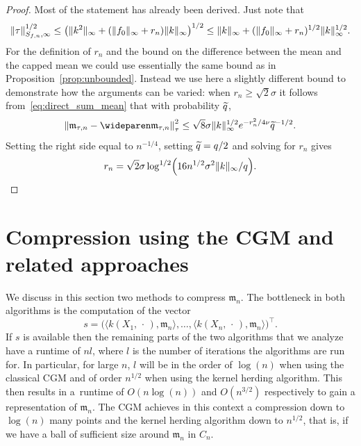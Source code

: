 \documentclass[AHL,Unicode,longabstracts,published]{cedram}
\theoremstyle{remark}
\newcommand{\mean}{\mathfrak{m}}
\let\oldtilde\tilde
\renewcommand*{\tilde}[1]{\mathchoice{\widetilde{#1}}{\widetilde{#1}}{\oldtilde{#1}}{\oldtilde{#1}}}
\let\originalleft\left
\let\originalright\right
\renewcommand{\left}{\mathopen{}\mathclose\bgroup\originalleft}
\renewcommand{\right}{\aftergroup\egroup\originalright}
\begin{document}
\begin{proof}
Most of the statement has already been derived. Just note that
\[
\|\tau\|_{S_{f,n},\infty}^{1/2}
\leq \left(\|k^2\|_\infty + (\|f_0\|_\infty + r_n) \|k\|_\infty\right)^{1/2} \leq \|k\|_\infty + (\|f_0\|_\infty + r_n)^{1/2} \|k\|_\infty^{1/2}.
\]
For the definition of $r_n$ and the bound on the difference between the mean and the capped mean we could use essentially the same bound as in Proposition~\ref{prop:unbounded}. Instead we use here a slightly different bound to demonstrate how the arguments can be varied: when $r_n \geq \sqrt{2} \sigma$ it follows from~\eqref{eq:direct_sum_mean} that with probability $\tilde q$,
\[
\left\| \mean_{\tau,n} - \wideparen \mean_{\tau,n} \right\|^2_\tau \leq \sqrt{8} \sigma \|k\|^{1/2}_\infty e^{-r_n^2/4 \nu}
\tilde q^{-1/2}.
\]
Setting the right side equal to $n^{-1/4}$, setting $\tilde q = q/2$ and solving for $r_n$ gives
\[
r_n =\sqrt{2} \sigma \log^{1/2}\left(16 n^{1/2} \sigma^2 \|k\|_\infty/ q\right).\qedhere
\]
\end{proof}



\section{Compression using the CGM and related approaches} \label{sec:algorithms}
We discuss in this section two methods to compress $\mean_n$. The bottleneck in both algorithms is the computation of the vector
\[
s = \bigl(\langle k(X_1,\,\cdot\,), \mean_n \rangle, \dots, \langle k(X_n,\,\cdot\,), \mean_n \rangle\bigr)^\top.
\]
If $s$ is available then the remaining parts of the two algorithms that we analyze have a runtime of $n l$, where $l$ is the number of iterations the algorithms are run for. In particular, for large $n$, $l$ will be in the order of $\log(n)$ when using the classical CGM and of order $n^{1/2}$ when using the kernel herding algorithm. This then results in a~runtime of $O(n \log(n))$ and $O(n^{3/2})$ respectively to gain a representation of $\mean_n$. The CGM achieves in this context a compression down to $\log(n)$ many points and the kernel herding algorithm down to $n^{1/2}$, that is, if we have a ball of sufficient size around $\mean_n$ in $C_n$.
\end{document}
